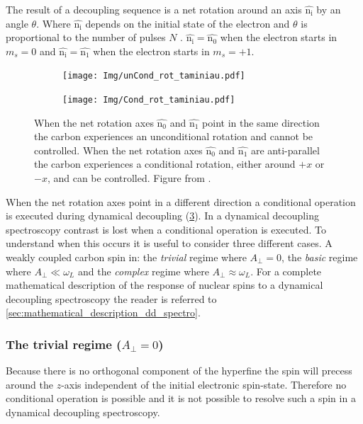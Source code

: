 The result of a decoupling sequence is a net rotation around an axis $\bm{\hat{\mathrm{n_i}}}$ by an angle $\theta$.
Where $\bm{\hat{\mathrm{n_i}}}$ depends on the initial state of the electron and $\theta$ is proportional to the number of pulses $N$ \citep{Taminiau2012Detection}.
$\bm{\hat{\mathrm{n_i}}} =\bm{\hat{\mathrm{n_0}}}$ when the electron starts in $m_s = 0$ and $\bm{\hat{\mathrm{n_i}}} =\bm{\hat{\mathrm{n_1}}}$ when the electron starts in $m_s = +1$.

\begin{figure}[htbp]
    \begin{subfigure}[t]{0.49\textwidth}\centering
        \centering
        \caption{}
        \texttt{[image: Img/unCond\_rot\_taminiau.pdf]}
        \label{fig:uncond_rot}
    \end{subfigure}
    \begin{subfigure}[t]{0.49\textwidth}\centering
        \centering
        \caption{}
        \texttt{[image: Img/Cond\_rot\_taminiau.pdf]}
        \label{fig:cond_rot}
    \end{subfigure}
    \caption{ When the net rotation axes $\bm{\hat{\mathrm{n_0}}}$ and $\bm{\hat{\mathrm{n_1}}}$ point in the same direction the carbon experiences an unconditional rotation and cannot be controlled.  When the net rotation axes $\bm{\hat{\mathrm{n_0}}}$ and $\bm{\hat{\mathrm{n_1}}}$ are anti-parallel the carbon experiences a conditional rotation, either around $+x$ or $-x$, and can be controlled. Figure from \citep{Taminiau2012Detection}.}
    \label{fig:conditional_and_unconditional_rotation}
\end{figure}

When the net rotation axes point in a different direction a conditional operation is executed during dynamical decoupling (\cref{fig:conditional_and_unconditional_rotation}).
In a dynamical decoupling spectroscopy contrast is lost when a conditional operation is executed.
To understand when this occurs it is useful to consider three different cases.
A weakly coupled carbon spin in: the \emph{trivial} regime where $A_\perp=0$, the \emph{basic} regime where $A_\perp \ll \omega_L$ and the \emph{complex} regime where $A_\perp \approx \omega_L$.
For a complete mathematical description of the response of nuclear spins to a dynamical decoupling spectroscopy the reader is referred to \cref{sec:mathematical_description_dd_spectro}.

\subsubsection{The trivial regime ($A_\perp=0$)}
Because there is no orthogonal component of the hyperfine the spin will precess around the $z$-axis independent of the initial electronic spin-state.
Therefore no conditional operation is possible and it is not possible to resolve such a spin in a dynamical decoupling spectroscopy.

